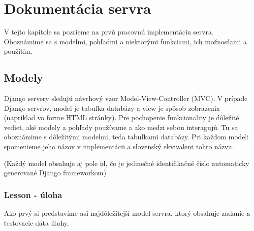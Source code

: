\chapter{Dokumentácia servra}
\label{kap:doc}



V tejto kapitole sa pozrieme na prvú pracovnú implementáciu servra. Oboznámime sa
s modelmi, pohľadmi a niektorými funkciami, ich možnosťami a použitím.
\section{Modely}
\label{modely}
Django servery sledujú návrhový vzor Model-View-Controller (MVC). V prípade Django servrov, model je tabuľka
databázy a view je spôsob zobrazenia (napríklad vo forme HTML stránky). Pre pochopenie
funkcionality je dôležité vedieť, aké modely a pohľady používame a ako medzi sebou interagujú.
\newline
Tu sa oboznámime s dôležitými modelmi, teda tabuľkami databázy.
Pri každom modeli spomenieme jeho názov v implementácii a slovenský ekvivalent tohto názvu.

(Každý model obsahuje aj pole id, čo je jedinečné identifikačné číslo automaticky generované
Django frameworkom)
\subsection{Lesson - úloha}
\label{doc:lesson}
Ako prvý si predstavíme asi najdôležitejší model servra, ktorý obsahuje zadanie a
testovacie dáta úlohy.

